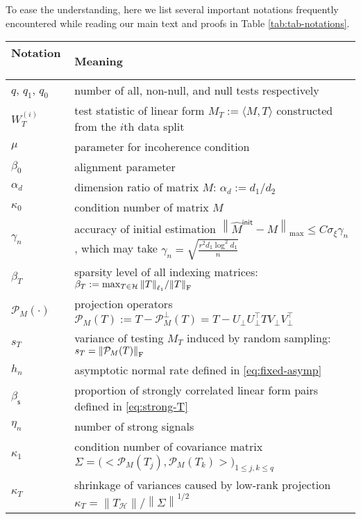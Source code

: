 \documentclass[12pt]{article}
\newcommand{\tF}{{\rm F}}
\newcommand{\norm}[1]{\left\lVert#1\right\rVert}
\newcommand{\cH}{\mathcal{H}}
\newcommand{\cP}{\mathcal{P}}
\def\calP{{\mathcal P}}
\theoremstyle{plain}
\begin{document}
To ease the understanding, here we list several important notations frequently encountered while reading our main text and proofs in Table \ref{tab:tab-notations}.
\begin{table}[htbp]
	\centering
	\begin{tabular}{|l|l|}
		\hline\hline
  Notation \ & Meaning \\
  \hline
		$q$, $q_1$, $q_0$ \ & number of all, non-null, and null tests respectively  \\ 
  \hline
    $W_T^{(i)}$ \ & test statistic of linear form $M_T:=\langle M, T\rangle$ constructed from the $i$th data split \\ 
    \hline
     $\mu$  & parameter for incoherence condition \\ %
     \hline
     $\beta_0$ &  alignment parameter  \\ %
     \hline
    $\alpha_d$ & dimension ratio of matrix $M$: $\alpha_d:= d_1/d_2$ \\
    \hline
    $\kappa_0$ & condition number of matrix $M$ \\
    \hline
    $\gamma_n$  & accuracy of initial estimation $\norm{\widehat{M}^{\mathsf{init}} - M}_{\max} \le C  \sigma_\xi \gamma_n$, which may take  $\gamma_n=\sqrt{\frac{r^2 d_1 \log ^2 d_1}{n}}$ \\
    \hline
    $\beta_T$  &  sparsity level of all indexing matrices: $\beta_T := \max_{T\in \cH}{ { \norm{T}_{\ell_1} }/{ \norm{T}_\tF } } $ \\
    \hline 
    $\cP_M(\cdot)$ & projection operators  $\cP_M^{}(T):= T- \cP_M^{\perp}(T)= T- U_{\perp} U^\top_{\perp} T V_{\perp}V^\top_{\perp}$ \\
    \hline
    $s_T$ & variance of testing $M_T$ induced by random sampling: $s_T=\norm{\cP_M(T) }_\tF$ \\
     \hline
    $h_n$  & asymptotic normal rate defined in \eqref{eq:fixed-asymp} \\
    \hline
    $\beta_{\mathsf{s} }$ &  proportion of strongly correlated linear form pairs defined in \eqref{eq:strong-T} \\
    \hline
    $\eta_n$ &  number of strong signals \\
    \hline
    $\kappa_1$ & condition number of covariance matrix $\Sigma=\big(\big<\calP_M(T_j), \calP_M(T_k)\big>\big)_{1\leq j,k\leq q}$ \\
    \hline
    $\kappa_T$ & shrinkage of variances caused by low-rank projection $\kappa_T = \norm{T_{\cH} }/\norm{\Sigma}^{1/2}$ \\

\end{tabular}
\end{table}
\end{document}
